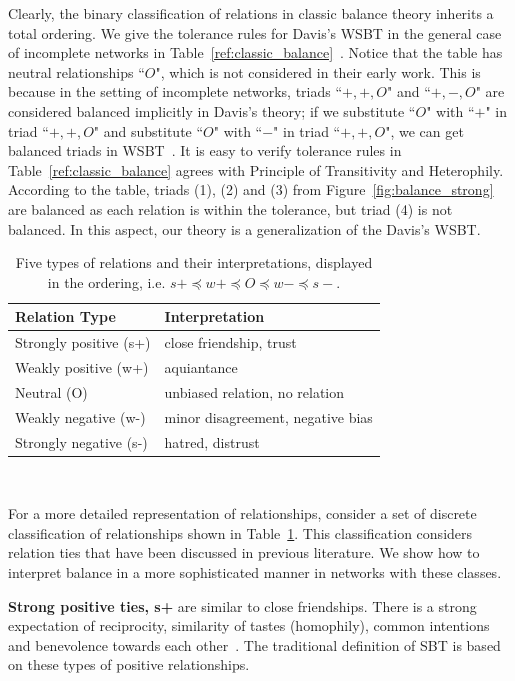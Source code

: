 {Clearly, the binary classification of relations in classic balance theory inherits a total ordering. We give the tolerance rules for Davis's WSBT in the general case of incomplete networks in Table~\ref{ref:classic_balance}~\cite{Davis:67}. Notice that the table has neutral relationships ``$O$", which is not considered in their early work. This is because in the setting of incomplete networks, triads ``$+, +, O$" and ``$+, -, O$" are considered balanced implicitly in Davis's theory; if we substitute ``$O$" with ``$+$" in triad ``$+, +, O$" and substitute ``$O$" with ``$-$" in triad ``$+, +, O$", we can get balanced triads in WSBT~\cite{kleinberg-book}. It is easy to verify tolerance rules in Table~\ref{ref:classic_balance} agrees with Principle of Transitivity and Heterophily. According to the table, triads (1), (2) and (3) from Figure~\ref{fig:balance_strong} are balanced as each relation is within the tolerance, but triad (4) is not balanced. In this aspect, our theory is a generalization of the Davis's WSBT.
\begin{table} [htbp!]
\begin{center}
\caption{\label{ref:rel_types}Five types of relations and their
  interpretations, displayed in the ordering, i.e. $s+\preceq
  w+\preceq O\preceq w- \preceq s-$.}
\begin{tabular}{p{1.6in}p{2.6in} }
Relation Type & Interpretation \\ \hline
Strongly positive (s+) & close friendship, trust  \\ 
Weakly positive (w+) & aquiantance \\
Neutral (O) & unbiased relation, no relation  \\
Weakly negative (w-) & minor disagreement, negative bias  \\
Strongly negative (s-) & hatred, distrust  
\end{tabular}\\\vspace{4mm}
\end{center}
\end{table}

For a more detailed representation of relationships, consider a set of discrete classification of relationships shown in Table~\ref{ref:rel_types}. This classification considers relation ties that have been discussed
in previous literature.  We show how to interpret balance in
a more sophisticated manner in networks with these classes. 

{\bf Strong positive ties, s+} are similar to close
friendships. There is a strong expectation of reciprocity, similarity
of tastes (homophily), common intentions and benevolence towards each
other~\cite{Tomasello:2005}. The traditional definition of SBT is
based on these types of positive relationships.

}
